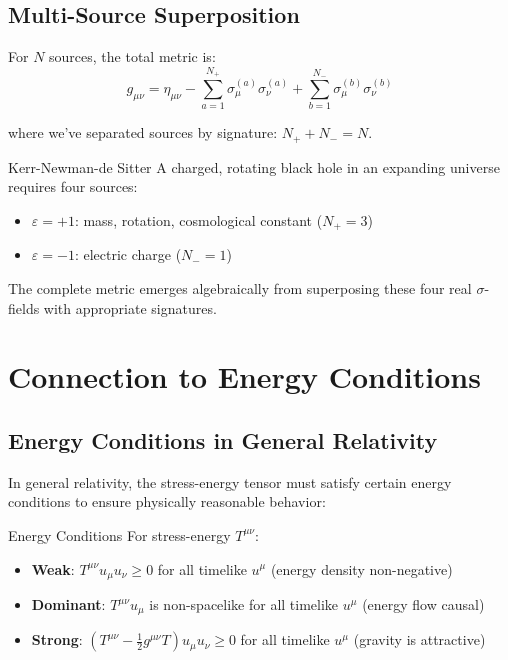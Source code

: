 \documentclass[11pt,a4paper]{article}
\theoremstyle{definition}
\theoremstyle{remark}
\begin{document}
	\subsection{Multi-Source Superposition}
	
	For $N$ sources, the total metric is:
	\begin{equation}
		g_{\mu\nu} = \eta_{\mu\nu} - \sum_{a=1}^{N_+} \sigma_\mu^{(a)}\sigma_\nu^{(a)} + \sum_{b=1}^{N_-} \sigma_\mu^{(b)}\sigma_\nu^{(b)}
		\label{eq:multi_source}
	\end{equation}
	
	where we've separated sources by signature: $N_+ + N_- = N$.
	
	Kerr-Newman-de Sitter
		A charged, rotating black hole in an expanding universe requires four sources:
		\begin{itemize}
			\item $\varepsilon = +1$: mass, rotation, cosmological constant ($N_+ = 3$)
			\item $\varepsilon = -1$: electric charge ($N_- = 1$)
		\end{itemize}
		
		The complete metric emerges algebraically from superposing these four real $\sigma$-fields with appropriate signatures.
	
	\section{Connection to Energy Conditions}
	
	\subsection{Energy Conditions in General Relativity}
	
	In general relativity, the stress-energy tensor must satisfy certain energy conditions to ensure physically reasonable behavior:
	
	Energy Conditions
		For stress-energy $T^{\mu\nu}$:
		\begin{itemize}
			\item \textbf{Weak}: $T^{\mu\nu}u_\mu u_\nu \geq 0$ for all timelike $u^\mu$ (energy density non-negative)
			\item \textbf{Dominant}: $T^{\mu\nu}u_\mu$ is non-spacelike for all timelike $u^\mu$ (energy flow causal)
			\item \textbf{Strong}: $(T^{\mu\nu} - \frac{1}{2}g^{\mu\nu}T)u_\mu u_\nu \geq 0$ for all timelike $u^\mu$ (gravity is attractive)
		\end{itemize}
	
\end{document}
